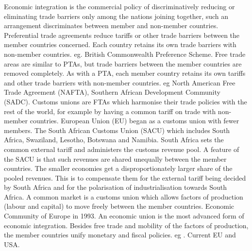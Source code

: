 \documentclass[12pt]{examnotes}
\begin{document}
\ra Economic integration is the commercial policy of discriminatively reducing or eliminating trade barriers only among the nations joining together, such an arrangement discriminates between member and non-member countries. 
 Preferential trade agreements reduce tariffs or other trade barriers between the member countries concerned. Each country retains its own trade barriers with non-member countries. eg. British Commonwealth Preference Scheme.
 Free trade areas are similar to PTAs, but trade barriers between the member countries are removed completely. As with a PTA, each member country retains its own tariffs and other trade barriers with non-member countries. eg North American Free Trade Agreement (NAFTA), Southern African Development Community (SADC).
 Customs unions are FTAs which harmonise their trade policies with the rest of the world, for example by having a common tariff on trade with non-member countries. European Union (EU) began as a customs union with fewer members. The South African Customs Union (SACU) which includes South Africa, Swaziland, Lesotho, Botswana and Namibia. South Africa sets the common external tariff and administers the customs revenue pool. A feature of the SACU is that such revenues are shared unequally between the member countries. The smaller economies get a disproportionately larger share of the pooled revenues. This is to compensate them for the external tariff being decided by South Africa and for the polarisation of industrialisation towards South Africa.
 A common market is a customs union which allows factors of production (labour and capital) to move freely between the member countries. Economic Community of Europe in 1993.
 An economic union is the most advanced form of economic integration. Besides free trade and mobility of the factors of production, the member countries unify monetary and fiscal policies. eg . Current EU and USA.
\end{document}
